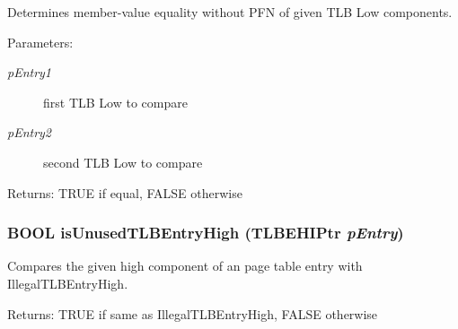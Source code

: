 Determines member-value equality without PFN of given TLB Low components. \begin{Desc}
\item[Parameters:]
\begin{description}
\item[{\em pEntry1}]first TLB Low to compare \item[{\em pEntry2}]second TLB Low to compare \end{description}
\end{Desc}
\begin{Desc}
\item[Returns:]TRUE if equal, FALSE otherwise \end{Desc}
\hypertarget{group___v_m_m___p_t_e_g89cd5f7eaa1cd827f630285c9a56443c}{
\subsubsection[{isUnusedTLBEntryHigh}]{\setlength{\rightskip}{0pt plus 5cm}BOOL isUnusedTLBEntryHigh ({\bf TLBEHIPtr} {\em pEntry})}}
\label{group___v_m_m___p_t_e_g89cd5f7eaa1cd827f630285c9a56443c}


Compares the given high component of an page table entry with IllegalTLBEntryHigh. \begin{Desc}
\item[Returns:]TRUE if same as IllegalTLBEntryHigh, FALSE otherwise \end{Desc}
